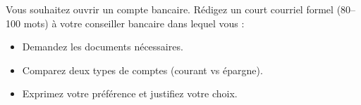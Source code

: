 \documentclass[11pt]{article}
\begin{document}
\begin{exercice}
Vous souhaitez ouvrir un compte bancaire. Rédigez un court courriel formel (80--100 mots) à votre conseiller bancaire dans lequel vous :
\begin{itemize}
    \item Demandez les documents nécessaires.
    \item Comparez deux types de comptes (courant vs épargne).
    \item Exprimez votre préférence et justifiez votre choix.
\end{itemize}
\end{exercice}
\end{document}
